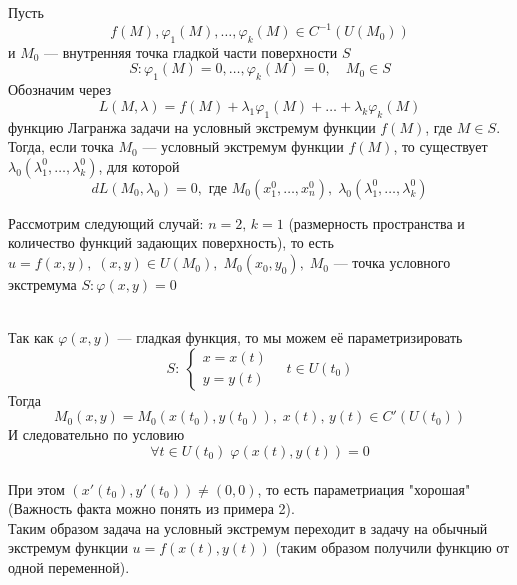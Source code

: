 \begin{Th}
    Пусть 
    \[
        f(M), \varphi_1(M), \dots, \varphi_k(M) \in C^{-1}(U(M_0))
    \] 
    и $M_0$ --- внутренняя точка гладкой части поверхности $S$ 
    \[
        S: \varphi_1(M) = 0, \dots, \varphi_k(M) = 0, \quad M_0 \in S
    \]
    Обозначим через 
    \[
        L(M, \lambda) = f(M) + \lambda_1\varphi_1(M) + \dots + \lambda_k\varphi_k(M)
    \]
    функцию Лагранжа задачи на условный экстремум функции $f(M)$, где $M \in S$. Тогда, если точка $M_0$ --- условный экстремум функции $f(M)$, то существует $\lambda_0(\lambda^0_1, \dots, \lambda^0_k)$, для которой
    \[
        dL(M_0, \lambda_0) = 0, \text{ где }  M_0(x^0_1, \dots, x^0_n), \; \lambda_0(\lambda^0_1, \dots, \lambda^0_k)
    \]
\end{Th}
\begin{Proof}
    Рассмотрим следующий случай: $n = 2, \, k = 1$ (размерность пространства и количество функций задающих поверхность), то есть $u = f(x, y), \; (x, y) \in U(M_0), \; M_0(x_0, y_0), \; M_0$ --- точка условного экстремума $S : \varphi(x, y) = 0$
    \begin{figure}[h!]
        \noindent{}
    \end{figure}\\
    Так как $\varphi(x, y)$ --- гладкая функция, то мы можем её параметризировать
    \[
        S :\: \begin{cases} 
            x = x(t)\\
            y = y(t)
          \end{cases} \quad t \in U(t_0)
    \]
    Тогда 
    \[
        M_0(x, y) = M_0(x(t_0), y(t_0)), \; x(t), \, y(t) \in C'(U(t_0))
    \]
    И следовательно по условию 
    \[
        \forall t \in U(t_0) \; \varphi(x(t), y(t)) = 0
    \]\\
    При этом $(x'(t_0), y'(t_0)) \neq (0, 0)$, то есть параметриация "хорошая" (Важность факта можно понять из примера 2).\\
    Таким образом задача на условный экстремум переходит в задачу на обычный экстремум функции $u = f(x(t), y(t))$ (таким образом получили функцию от одной переменной).\\

\end{Proof}
